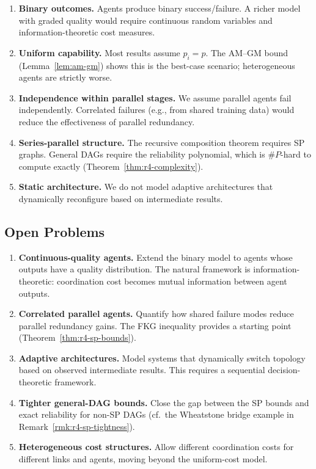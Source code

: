 \documentclass[12pt,a4paper]{article}
\theoremstyle{plain}
\theoremstyle{definition}
\theoremstyle{remark}
\begin{document}
\begin{enumerate}
  \item \textbf{Binary outcomes.}  Agents produce binary success/failure.
    A richer model with graded quality would require continuous random
    variables and information-theoretic cost measures.

  \item \textbf{Uniform capability.}  Most results assume $p_i = p$.
    The AM--GM bound (Lemma~\ref{lem:am-gm}) shows this is the
    best-case scenario; heterogeneous agents are strictly worse.

  \item \textbf{Independence within parallel stages.}  We assume
    parallel agents fail independently.  Correlated failures (e.g., from
    shared training data) would reduce the effectiveness of parallel
    redundancy.

  \item \textbf{Series-parallel structure.}  The recursive composition
    theorem requires SP graphs.  General DAGs require the reliability
    polynomial, which is $\#P$-hard to compute exactly
    (Theorem~\ref{thm:r4-complexity}).

  \item \textbf{Static architecture.}  We do not model adaptive
    architectures that dynamically reconfigure based on intermediate
    results.
\end{enumerate}

\subsection{Open Problems}

\begin{enumerate}
  \item \textbf{Continuous-quality agents.}  Extend the binary model to
    agents whose outputs have a quality distribution.  The natural
    framework is information-theoretic: coordination cost becomes mutual
    information between agent outputs.

  \item \textbf{Correlated parallel agents.}  Quantify how shared
    failure modes reduce parallel redundancy gains.  The FKG inequality
    provides a starting point (Theorem~\ref{thm:r4-sp-bounds}).

  \item \textbf{Adaptive architectures.}  Model systems that dynamically
    switch topology based on observed intermediate results.  This
    requires a sequential decision-theoretic framework.

  \item \textbf{Tighter general-DAG bounds.}  Close the gap between the
    SP bounds and exact reliability for non-SP DAGs (cf.\ the Wheatstone
    bridge example in Remark~\ref{rmk:r4-sp-tightness}).

  \item \textbf{Heterogeneous cost structures.}  Allow different
    coordination costs for different links and agents, moving beyond
    the uniform-cost model.
\end{enumerate}
\end{document}

